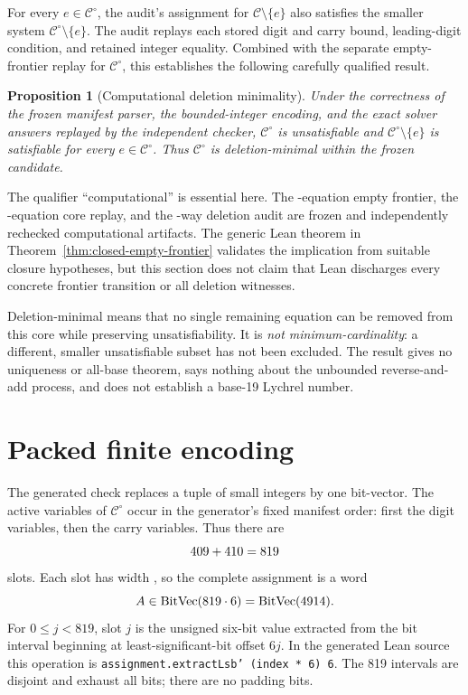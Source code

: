 \documentclass[11pt,twoside]{article}
\newtheorem{proposition}[definition]{Proposition}
\theoremstyle{remark}
\newcommand{\Candidate}{\ensuremath{\mathcal{C}}}
\newcommand{\Core}{\ensuremath{\mathcal{C}^{\circ}}}
\begin{document}
For every $e\in\Core$, the audit's assignment for
$\Candidate\setminus\{e\}$ also satisfies the smaller system
$\Core\setminus\{e\}$.  The audit replays each stored digit and carry bound,
leading-digit condition, and retained integer equality.  Combined with the
separate empty-frontier replay for $\Core$, this establishes the following
carefully qualified result.

\begin{proposition}[Computational deletion minimality]
\label{prop:deletion-minimality}
Under the correctness of the frozen manifest parser, the bounded-integer
encoding, and the exact solver answers replayed by the independent checker,
$\Core$ is unsatisfiable and $\Core\setminus\{e\}$ is satisfiable for every
$e\in\Core$.  Thus $\Core$ is deletion-minimal within the frozen candidate.
\end{proposition}

The qualifier ``computational'' is essential here.  The
\CandidateEquationCount-equation empty frontier, the
\CoreEquationCount-equation core replay, and the
\DeletionAuditCount-way deletion audit are frozen and independently rechecked
computational artifacts.  The generic Lean theorem in
Theorem~\ref{thm:closed-empty-frontier} validates the implication from
suitable closure hypotheses, but this section does not claim that Lean
discharges every concrete frontier transition or all deletion witnesses.

\begin{nonclaim}
Deletion-minimal means that no single remaining equation can be removed from
this core while preserving unsatisfiability.  It is \emph{not
minimum-cardinality}: a different, smaller unsatisfiable subset has not been
excluded.  The result gives no uniqueness or all-base theorem, says nothing
about the unbounded reverse-and-add process, and does not establish a base-19
Lychrel number.
\end{nonclaim}

\section{Packed finite encoding}
\label{sec:packed-encoding}

The generated check replaces a tuple of small integers by one bit-vector.
The active variables of $\Core$ occur in the generator's fixed manifest order:
first the \ActiveDigitCount{} digit variables, then the \ActiveCarryCount{}
carry variables.  Thus there are
\[
  409+410=819
\]
slots.  Each slot has width \PackedSlotWidth{}, so the complete assignment is
a word
\[
  A\in\operatorname{BitVec}(819\cdot6)
    =\operatorname{BitVec}(4914).
\]
For $0\leq j<819$, slot $j$ is the unsigned six-bit value extracted from
the bit interval beginning at least-significant-bit offset $6j$.  In the
generated Lean source this operation is
\texttt{assignment.extractLsb' (index * 6) 6}.  The 819 intervals are
disjoint and exhaust all \PackedWidth{} bits; there are no padding bits.
\end{document}
